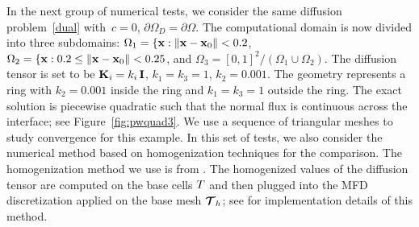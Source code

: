 	
	In the next group of numerical tests, we consider the same  diffusion problem~\eqref{dual}
        with~$c = 0$, $\partial\Omega_D = \partial\Omega$. The computational domain is now
        divided into three subdomains: $\Omega_1 = \{{\bf x} : \|{\bf x} - {\bf x}_0\| < 0.2$,
        $\Omega_2 = \{{\bf x} : 0.2 \le \|{\bf x} - {\bf x}_0\| < 0.25$, and
        $\Omega_3 = [0,1]^2 / (\Omega_1\cup\Omega_2)$. The diffusion tensor is set to be
        $\boldsymbol{\mathbf{K}}_i = k_i\,\boldsymbol{\mathbf{I}}$, $k_{1} = k_{3} = 1$, $k_2 = 0.001$.
        The geometry represents a ring with $k_2=0.001$ inside the ring and $k_{1} = k_{3} = 1$ outside
        the ring. The exact solution is piecewise quadratic such that the normal flux is
        continuous across the interface; see Figure~\ref{fig:pwquad3}.
        We use a sequence of triangular meshes to study convergence for this example. In this set of tests, we also consider the numerical method based on homogenization techniques for the comparison. The homogenization method we use is from \cite{dawes2013solving}. The homogenized values of the diffusion tensor are computed on the base cells $T$ and then plugged into the MFD discretization applied on the  base mesh ${\boldsymbol{\mathbf{\mathcal T}}}_h$; see \cite{kikinzon2017approximate} for implementation details of this method.

